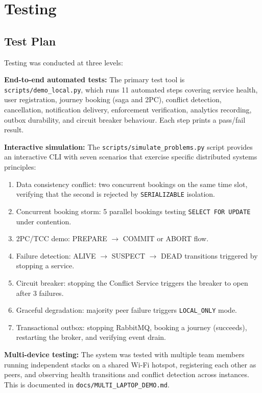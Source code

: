 \documentclass[12pt,a4paper]{article}
\begin{document}
\section{Testing}
\label{sec:testing}
 
\subsection{Test Plan}
 
Testing was conducted at three levels:
 
\textbf{End-to-end automated tests:} The primary test tool is \texttt{scripts/demo\_local.py}, which runs 11 automated steps covering service health, user registration, journey booking (saga and 2PC), conflict detection, cancellation, notification delivery, enforcement verification, analytics recording, outbox durability, and circuit breaker behaviour. Each step prints a pass/fail result.
 
\textbf{Interactive simulation:} The \texttt{scripts/simulate\_problems.py} script provides an interactive CLI with seven scenarios that exercise specific distributed systems principles:
 
\begin{enumerate}
    \item Data consistency conflict: two concurrent bookings on the same time slot, verifying that the second is rejected by \texttt{SERIALIZABLE} isolation.
    \item Concurrent booking storm: 5 parallel bookings testing \texttt{SELECT FOR UPDATE} under contention.
    \item 2PC/TCC demo: PREPARE $\rightarrow$ COMMIT or ABORT flow.
    \item Failure detection: ALIVE $\rightarrow$ SUSPECT $\rightarrow$ DEAD transitions triggered by stopping a service.
    \item Circuit breaker: stopping the Conflict Service triggers the breaker to open after 3 failures.
    \item Graceful degradation: majority peer failure triggers \texttt{LOCAL\_ONLY} mode.
    \item Transactional outbox: stopping RabbitMQ, booking a journey (succeeds), restarting the broker, and verifying event drain.
\end{enumerate}
 
\textbf{Multi-device testing:} The system was tested with multiple team members running independent stacks on a shared Wi-Fi hotspot, registering each other as peers, and observing health transitions and conflict detection across instances. This is documented in \texttt{docs/MULTI\_LAPTOP\_DEMO.md}.
 
\end{document}
